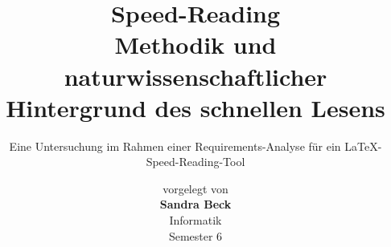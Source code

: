 \documentclass[
	11pt, 				%
	a4paper,			%
 	DIV = calc, 		%
 	oneside, 			%
 	parskip=half+, 		%
 	bigheadings, 		%
 	bibtotoc,			%
 	liststotoc,			%
 	cleardoubleempty, 	%
 	halfparskip,		%
 	openany			 
	]{scrbook}
\title{Speed-Reading \\ Methodik und naturwissenschaftlicher Hintergrund des schnellen Lesens}\bigskip
\subtitle{\Large Eine Untersuchung im Rahmen einer Requirements-Analyse für ein \LaTeX - Speed-Reading-Tool}
\author{vorgelegt von \\ \textbf{Sandra Beck} \\   Informatik \\ Semester 6}
\begin{document}
	\maketitle 
	\clearpage 
	
	\cleardoublepage 	
	\tableofcontents
	\cleardoublepage
	
	\cleardoublepage 
	
	\cleardoublepage 
	
	\cleardoublepage 
	
	\cleardoublepage 
	\printnoidxglossaries 
	\cleardoublepage
	\printbibliography
	\cleardoublepage 
	\listoffigures
\end{document}
